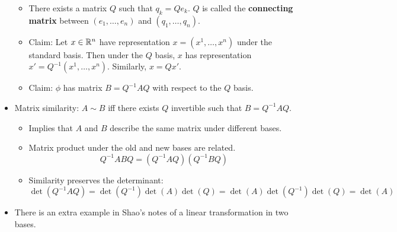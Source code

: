 \documentclass[../notes.tex]{subfiles}
\begin{document}
\begin{itemize}
    \begin{itemize}
        \item There exists a matrix $Q$ such that $q_k=Qe_k$. $Q$ is called the \textbf{connecting matrix} between $(e_1,\dots,e_n)$ and $(q_1,\dots,q_n)$.
        \item Claim: Let $x\in\mathbb{R}^n$ have representation $x=(x^1,\dots,x^n)$ under the standard basis. Then under the $Q$ basis, $x$ has representation $x'=Q^{-1}(x^1,\dots,x^n)$. Similarly, $x=Qx'$.
        \item Claim: $\phi$ has matrix $B=Q^{-1}AQ$ with respect to the $Q$ basis.
    \end{itemize}
    \item Matrix similarity: $A\sim B$ iff there exists $Q$ invertible such that $B=Q^{-1}AQ$.
    \begin{itemize}
        \item Implies that $A$ and $B$ describe the same matrix under different bases.
        \item Matrix product under the old and new bases are related.
        \begin{equation*}
            Q^{-1}ABQ = (Q^{-1}AQ)(Q^{-1}BQ)
        \end{equation*}
        \item Similarity preserves the determinant:
        \begin{equation*}
            \det(Q^{-1}AQ) = \det(Q^{-1})\det(A)\det(Q)
            = \det(A)\det(Q^{-1})\det(Q)
            = \det(A)
        \end{equation*}
    \end{itemize}
    \item There is an extra example in Shao's notes of a linear transformation in two bases.
\end{itemize}
\end{document}
